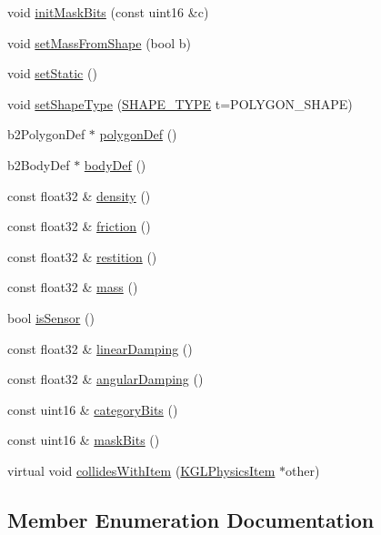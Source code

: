 \begin{CompactItemize}
\begin{CompactItemize}
void \hyperlink{class_k_g_l_physics_item_0837f29f919d93cfca1429415b072b22}{initMaskBits} (const uint16 \&c)
\item 
void \hyperlink{class_k_g_l_physics_item_8ccd7feacbfc2c4e6d035bc147138cde}{setMassFromShape} (bool b)
\item 
void \hyperlink{class_k_g_l_physics_item_10f8810cfd4018543a169df37a7a7cc1}{setStatic} ()
\item 
void \hyperlink{class_k_g_l_physics_item_8c86227c571bfa83e6aefbaa1ef573df}{setShapeType} (\hyperlink{class_k_g_l_physics_item_b74dbd1e43d8bc18ec4fc6c16d3d4b7c}{SHAPE\_\-TYPE} t=POLYGON\_\-SHAPE)
\item 
b2PolygonDef $\ast$ \hyperlink{class_k_g_l_physics_item_ca68c4c36791432954708a3253ac1f73}{polygonDef} ()
\item 
b2BodyDef $\ast$ \hyperlink{class_k_g_l_physics_item_384af73ef980d7404c4e4cf4332bb332}{bodyDef} ()
\item 
const float32 \& \hyperlink{class_k_g_l_physics_item_c908866d9a749e6bce529b6e4f3ed80b}{density} ()
\item 
const float32 \& \hyperlink{class_k_g_l_physics_item_656cc790aa2b53f3c45e4488aad35887}{friction} ()
\item 
const float32 \& \hyperlink{class_k_g_l_physics_item_a6fec0352a3214ab5ec031eccc2952ac}{restition} ()
\item 
const float32 \& \hyperlink{class_k_g_l_physics_item_17c7c15ab2ec62db4f17da9cc31506da}{mass} ()
\item 
bool \hyperlink{class_k_g_l_physics_item_eddb441690ec42d679aba642bc12dee3}{isSensor} ()
\item 
const float32 \& \hyperlink{class_k_g_l_physics_item_e83c6834e417cd7da10481d0878b9c40}{linearDamping} ()
\item 
const float32 \& \hyperlink{class_k_g_l_physics_item_faf0f2e3fd56195ce1e165b5f206855a}{angularDamping} ()
\item 
const uint16 \& \hyperlink{class_k_g_l_physics_item_870ea0d4451995acf418807dd535d82d}{categoryBits} ()
\item 
const uint16 \& \hyperlink{class_k_g_l_physics_item_4d60872591ae5b15ebd01f2f46c40ab6}{maskBits} ()
\item 
virtual void \hyperlink{class_k_g_l_physics_item_e531b03571d9d7bc17a76bbf9fbc2d8a}{collidesWithItem} (\hyperlink{class_k_g_l_physics_item}{KGLPhysicsItem} $\ast$other)
\end{CompactItemize}


\subsection{Member Enumeration Documentation}
\hypertarget{class_k_g_l_physics_item_b74dbd1e43d8bc18ec4fc6c16d3d4b7c}{
}
\end{CompactItemize}
